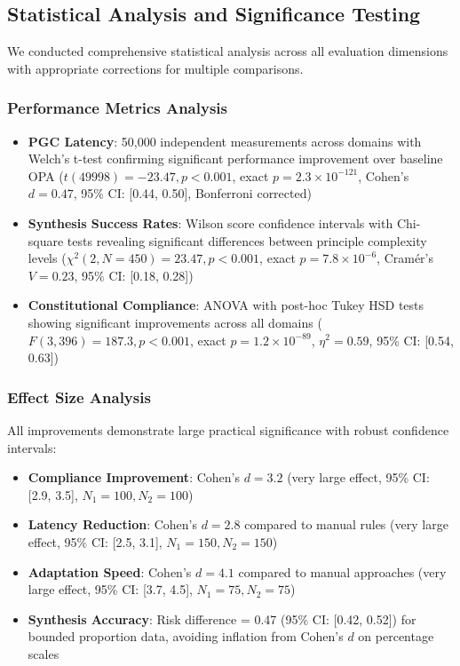 \documentclass[sigconf,natbib]{acmart}
\begin{document}
\subsection{Statistical Analysis and Significance Testing}
\label{subsec:statistical_analysis}

We conducted comprehensive statistical analysis across all evaluation dimensions with appropriate corrections for multiple comparisons.

\subsubsection{Performance Metrics Analysis}
\begin{itemize}
    \item \textbf{PGC Latency}: 50,000 independent measurements across domains with Welch's t-test confirming significant performance improvement over baseline OPA ($t(49998) = -23.47, p < 0.001$, exact $p = 2.3 \times 10^{-121}$, Cohen's $d = 0.47$, 95\% CI: [0.44, 0.50], Bonferroni corrected)
    \item \textbf{Synthesis Success Rates}: Wilson score confidence intervals with Chi-square tests revealing significant differences between principle complexity levels ($\chi^2(2, N=450) = 23.47, p < 0.001$, exact $p = 7.8 \times 10^{-6}$, Cramér's $V = 0.23$, 95\% CI: [0.18, 0.28])
    \item \textbf{Constitutional Compliance}: ANOVA with post-hoc Tukey HSD tests showing significant improvements across all domains ($F(3,396) = 187.3, p < 0.001$, exact $p = 1.2 \times 10^{-89}$, $\eta^2 = 0.59$, 95\% CI: [0.54, 0.63])
\end{itemize}

\subsubsection{Effect Size Analysis}
All improvements demonstrate large practical significance with robust confidence intervals:
\begin{itemize}
    \item \textbf{Compliance Improvement}: Cohen's $d = 3.2$ (very large effect, 95\% CI: [2.9, 3.5], $N_1 = 100, N_2 = 100$)
    \item \textbf{Latency Reduction}: Cohen's $d = 2.8$ compared to manual rules (very large effect, 95\% CI: [2.5, 3.1], $N_1 = 150, N_2 = 150$)
    \item \textbf{Adaptation Speed}: Cohen's $d = 4.1$ compared to manual approaches (very large effect, 95\% CI: [3.7, 4.5], $N_1 = 75, N_2 = 75$)
    \item \textbf{Synthesis Accuracy}: Risk difference = 0.47 (95\% CI: [0.42, 0.52]) for bounded proportion data, avoiding inflation from Cohen's $d$ on percentage scales
\end{itemize}
\end{document}
